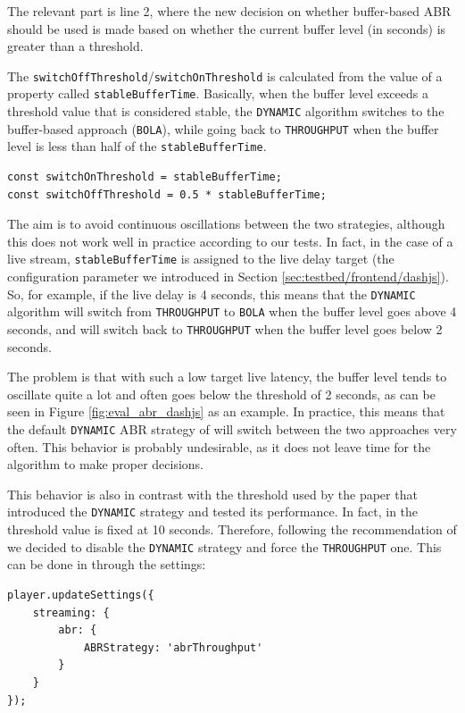 The relevant part is line 2, where the new decision on whether buffer-based ABR should be used is made based on whether the current buffer level (in seconds) is greater than a threshold.

The \texttt{switchOffThreshold}/\texttt{switchOnThreshold} is calculated from the value of a property called \texttt{stableBufferTime}. Basically, when the buffer level exceeds a threshold value that is considered stable, the \texttt{DYNAMIC} algorithm switches to the buffer-based approach (\texttt{BOLA}), while going back to \texttt{THROUGHPUT} when the buffer level is less than half of the \texttt{stableBufferTime}.

\begin{verbatim}
const switchOnThreshold = stableBufferTime;
const switchOffThreshold = 0.5 * stableBufferTime;
\end{verbatim}

The aim is to avoid continuous oscillations between the two strategies, although this does not work well in practice according to our tests. In fact, in the case of a live stream, \texttt{stableBufferTime} is assigned to the live delay target (the configuration parameter we introduced in Section \ref{sec:testbed/frontend/dashjs}). So, for example, if the live delay is 4 seconds, this means that the \texttt{DYNAMIC} algorithm will switch from \texttt{THROUGHPUT} to \texttt{BOLA} when the buffer level goes above 4 seconds, and will switch back to \texttt{THROUGHPUT} when the buffer level goes below 2 seconds.

The problem is that with such a low target live latency, the buffer level tends to oscillate quite a lot and often goes below the threshold of 2 seconds, as can be seen in Figure \ref{fig:eval_abr_dashjs} as an example. In practice, this means that the default \texttt{DYNAMIC} ABR strategy of \dashjs{} will switch between the two approaches very often. This behavior is probably undesirable, as it does not leave time for the algorithm to make proper decisions.

This behavior is also in contrast with the threshold used by the paper that introduced the \texttt{DYNAMIC} strategy and tested its performance. In fact, in \cite{dashjs_dynamic} the threshold value is fixed at 10 seconds. Therefore, following the recommendation of \cite{dashjs_dynamic} we decided to disable the \texttt{DYNAMIC} strategy and force the \texttt{THROUGHPUT} one. This can be done in \dashjs{} through the settings:

\begin{verbatim}
player.updateSettings({
    streaming: {
        abr: {
            ABRStrategy: 'abrThroughput'
        }
    }
});
\end{verbatim}

